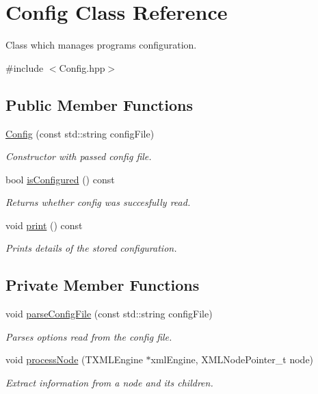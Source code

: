 \hypertarget{class_config}{}\section{Config Class Reference}
\label{class_config}


Class which manages programs configuration.  




{\ttfamily \#include $<$Config.\+hpp$>$}

\subsection*{Public Member Functions}
\begin{DoxyCompactItemize}
\item 
\hyperlink{class_config_af8b0e9dc72b16b73ebb32d177fb93e1b}{Config} (const std\+::string config\+File)
\begin{DoxyCompactList}\small\item\em Constructor with passed config file. \end{DoxyCompactList}\item 
bool \hyperlink{class_config_a47870f3f5bc52f5d0aa387c25e431055}{is\+Configured} () const
\begin{DoxyCompactList}\small\item\em Returns whether config was succesfully read. \end{DoxyCompactList}\item 
void \hyperlink{class_config_af75cb5a60c6cac9d6f6d030e65a5240a}{print} () const
\begin{DoxyCompactList}\small\item\em Prints details of the stored configuration. \end{DoxyCompactList}\end{DoxyCompactItemize}
\subsection*{Private Member Functions}
\begin{DoxyCompactItemize}
\item 
void \hyperlink{class_config_a3092a6e3ba0458b6bedca09f841f554e}{parse\+Config\+File} (const std\+::string config\+File)
\begin{DoxyCompactList}\small\item\em Parses options read from the config file. \end{DoxyCompactList}\item 
void \hyperlink{class_config_a46d81f90a7b6218385e8bfd0a283f6ce}{process\+Node} (T\+X\+M\+L\+Engine $\ast$xml\+Engine, X\+M\+L\+Node\+Pointer\+\_\+t node)
\begin{DoxyCompactList}\small\item\em Extract information from a node and its children. \end{DoxyCompactList}\end{DoxyCompactItemize}
